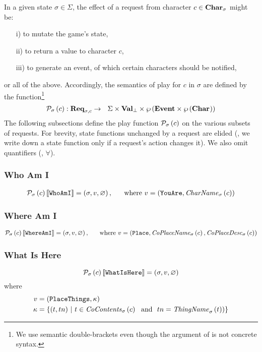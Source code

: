 In a given state $\sigma \in \Sigma$, the effect of a request from
character $c \in \textbf{Char}_{\sigma}$ might be:
\begin{itemize}
\item[i)] to mutate the game's state,
\item[ii)] to return a value to character $c$,
\item[iii)] to generate an event, of which certain characters should
  be notified,
\end{itemize}
or all of the above. Accordingly, the semantics of play for $c$ in
$\sigma$ are defined by the function\footnote{We use semantic
  double-brackets even though the argument of  is
  not concrete syntax.}
\[ \mathit{\mathcal{P}}_{\sigma}\left(c\right): \textbf{Req}_{\sigma,c} \rightarrow
~~\Sigma \times {\ensuremath{\textbf{Val}}}_{\bot} \times \wp\left(\textbf{Event}
  \times \wp\left(\textbf{Char}_{}\right)\right)
\]
The following subsections define the play function
$\mathit{\mathcal{P}}_{\sigma}\left(c\right)$ on the
various subsets of requests. For brevity, state functions unchanged by
a request are elided (\ie, we write down a state function only if a
request's action changes it). We also omit quantifiers (\eg, $\forall$).

\subsubsection{Who Am I}
\begin{align*}
  \mathit{\mathcal{P}}_{\sigma}\left(c\right)\llbracket \texttt{WhoAmI} \rrbracket = \left(\sigma, v, \varnothing\right), ~~~~~\text{where}~v =
  (\texttt{YouAre}, \mathit{CharName}_{\sigma}\left(c\right))
\end{align*}

\subsubsection{Where Am I}
\begin{align*}
  \mathit{\mathcal{P}}_{\sigma}\left(c\right)\llbracket \texttt{WhereAmI} \rrbracket = \left(\sigma, v, \varnothing\right), ~~~~~\text{where}~v =
  (\texttt{Place}, \mathit{CoPlaceName}_{\sigma}\left(c\right), \mathit{CoPlaceDesc}_{\sigma}\left(c\right))
\end{align*}

\subsubsection{What Is Here}
\[  \mathit{\mathcal{P}}_{\sigma}\left(c\right)\llbracket \texttt{WhatIsHere} \rrbracket =
\left(\sigma, v, \varnothing\right) \]
where
\begin{align*}
  v &= (\texttt{PlaceThings}, \kappa) \\
  \kappa & = \{ (t, tn) ~|~ t \in
  \mathit{CoContents}_{\sigma}\left(c\right) ~~\text{and}~~tn = \mathit{ThingName}_{\sigma}\left(t\right))\}
\end{align*}

